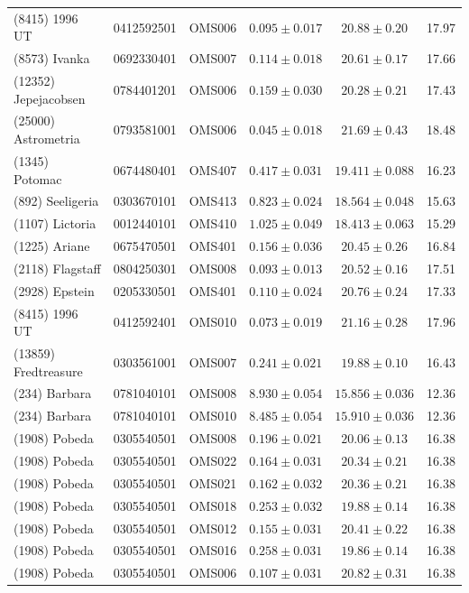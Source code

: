 \begin{table}[t]
\begin{tabular}{lllccc}
(8415) 1996 UT & 0412592501 & OMS006 & $0.095 \pm 0.017$ & $20.88 \pm 0.20$ & 17.97 \\
(8573) Ivanka & 0692330401 & OMS007 & $0.114 \pm 0.018$ & $20.61 \pm 0.17$ & 17.66 \\
(12352) Jepejacobsen & 0784401201 & OMS006 & $0.159 \pm 0.030$ & $20.28 \pm 0.21$ & 17.43 \\
(25000) Astrometria & 0793581001 & OMS006 & $0.045 \pm 0.018$ & $21.69 \pm 0.43$ & 18.48 \\
(1345) Potomac & 0674480401 & OMS407 & $0.417 \pm 0.031$ & $19.411 \pm 0.088$ & 16.23 \\
(892) Seeligeria & 0303670101 & OMS413 & $0.823 \pm 0.024$ & $18.564 \pm 0.048$ & 15.63 \\
(1107) Lictoria & 0012440101 & OMS410 & $1.025 \pm 0.049$ & $18.413 \pm 0.063$ & 15.29 \\
(1225) Ariane & 0675470501 & OMS401 & $0.156 \pm 0.036$ & $20.45 \pm 0.26$ & 16.84 \\
(2118) Flagstaff & 0804250301 & OMS008 & $0.093 \pm 0.013$ & $20.52 \pm 0.16$ & 17.51 \\
(2928) Epstein & 0205330501 & OMS401 & $0.110 \pm 0.024$ & $20.76 \pm 0.24$ & 17.33 \\
(8415) 1996 UT & 0412592401 & OMS010 & $0.073 \pm 0.019$ & $21.16 \pm 0.28$ & 17.96 \\
(13859) Fredtreasure & 0303561001 & OMS007 & $0.241 \pm 0.021$ & $19.88 \pm 0.10$ & 16.43 \\
(234) Barbara & 0781040101 & OMS008 & $8.930 \pm 0.054$ & $15.856 \pm 0.036$ & 12.36 \\
(234) Barbara & 0781040101 & OMS010 & $8.485 \pm 0.054$ & $15.910 \pm 0.036$ & 12.36 \\
(1908) Pobeda & 0305540501 & OMS008 & $0.196 \pm 0.021$ & $20.06 \pm 0.13$ & 16.38 \\
(1908) Pobeda & 0305540501 & OMS022 & $0.164 \pm 0.031$ & $20.34 \pm 0.21$ & 16.38 \\
(1908) Pobeda & 0305540501 & OMS021 & $0.162 \pm 0.032$ & $20.36 \pm 0.21$ & 16.38 \\
(1908) Pobeda & 0305540501 & OMS018 & $0.253 \pm 0.032$ & $19.88 \pm 0.14$ & 16.38 \\
(1908) Pobeda & 0305540501 & OMS012 & $0.155 \pm 0.031$ & $20.41 \pm 0.22$ & 16.38 \\
(1908) Pobeda & 0305540501 & OMS016 & $0.258 \pm 0.031$ & $19.86 \pm 0.14$ & 16.38 \\
(1908) Pobeda & 0305540501 & OMS006 & $0.107 \pm 0.031$ & $20.82 \pm 0.31$ & 16.38 \\

\end{tabular}
\end{table}

